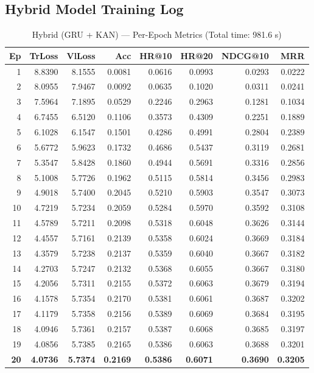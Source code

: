 \documentclass[12pt,a4paper]{report}
\begin{document}
\subsection{Hybrid Model Training Log}

\begin{table}[H]
\centering
\caption{Hybrid (GRU + KAN) --- Per-Epoch Metrics (Total time: 981.6 s)}
\small
\begin{tabular}{r r r r r r r r}
\toprule
\textbf{Ep} & \textbf{TrLoss} & \textbf{VlLoss} & \textbf{Acc} & \textbf{HR@10} & \textbf{HR@20} & \textbf{NDCG@10} & \textbf{MRR} \\
\midrule
 1  & 8.8390 & 8.1555 & 0.0081 & 0.0616 & 0.0993 & 0.0293 & 0.0222 \\
 2  & 8.0955 & 7.9467 & 0.0092 & 0.0635 & 0.1020 & 0.0311 & 0.0241 \\
 3  & 7.5964 & 7.1895 & 0.0529 & 0.2246 & 0.2963 & 0.1281 & 0.1034 \\
 4  & 6.7455 & 6.5120 & 0.1106 & 0.3573 & 0.4309 & 0.2251 & 0.1889 \\
 5  & 6.1028 & 6.1547 & 0.1501 & 0.4286 & 0.4991 & 0.2804 & 0.2389 \\
 6  & 5.6772 & 5.9623 & 0.1732 & 0.4686 & 0.5437 & 0.3119 & 0.2681 \\
 7  & 5.3547 & 5.8428 & 0.1860 & 0.4944 & 0.5691 & 0.3316 & 0.2856 \\
 8  & 5.1008 & 5.7726 & 0.1962 & 0.5115 & 0.5814 & 0.3456 & 0.2983 \\
 9  & 4.9018 & 5.7400 & 0.2045 & 0.5210 & 0.5903 & 0.3547 & 0.3073 \\
10  & 4.7219 & 5.7234 & 0.2059 & 0.5284 & 0.5970 & 0.3592 & 0.3108 \\
11  & 4.5789 & 5.7211 & 0.2098 & 0.5318 & 0.6048 & 0.3626 & 0.3144 \\
12  & 4.4557 & 5.7161 & 0.2139 & 0.5358 & 0.6024 & 0.3669 & 0.3184 \\
13  & 4.3579 & 5.7238 & 0.2137 & 0.5359 & 0.6040 & 0.3667 & 0.3182 \\
14  & 4.2703 & 5.7247 & 0.2132 & 0.5368 & 0.6055 & 0.3667 & 0.3180 \\
15  & 4.2056 & 5.7311 & 0.2155 & 0.5372 & 0.6063 & 0.3679 & 0.3194 \\
16  & 4.1578 & 5.7354 & 0.2170 & 0.5381 & 0.6061 & 0.3687 & 0.3202 \\
17  & 4.1179 & 5.7358 & 0.2156 & 0.5389 & 0.6069 & 0.3684 & 0.3195 \\
18  & 4.0946 & 5.7361 & 0.2157 & 0.5387 & 0.6068 & 0.3685 & 0.3197 \\
19  & 4.0856 & 5.7385 & 0.2165 & 0.5386 & 0.6063 & 0.3688 & 0.3201 \\
\textbf{20} & \textbf{4.0736} & \textbf{5.7374} & \textbf{0.2169} & \textbf{0.5386} & \textbf{0.6071} & \textbf{0.3690} & \textbf{0.3205} \\
\bottomrule
\end{tabular}
\label{tab:hybrid_log}
\end{table}
\end{document}
